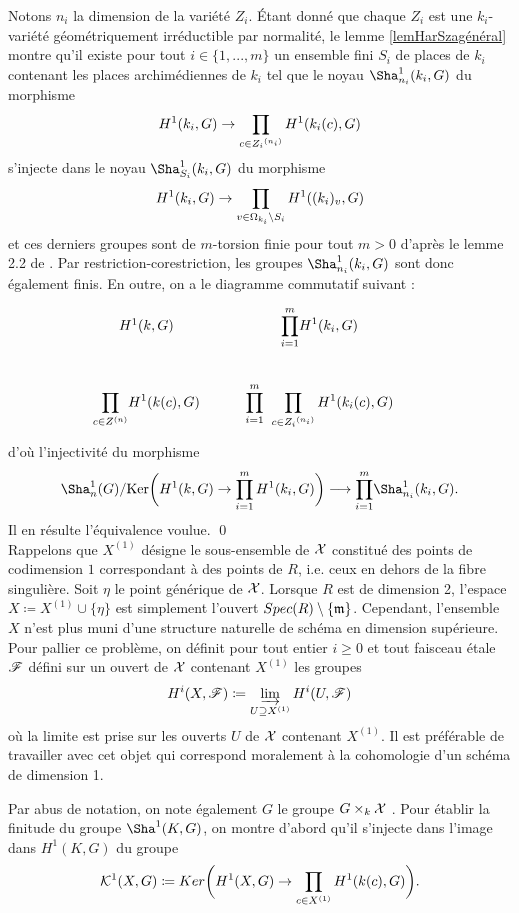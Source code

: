\documentclass[11pt]{article}
\begin{document}
\proof Notons $n_i$ la dimension de la variété $Z_i$. Étant donné que chaque $Z_{i}$ est une $k_i$-variété géométriquement irréductible par normalité, le lemme \ref{lemHarSzagénéral} montre qu'il existe pour tout $i \in \{1,...,m\}$ un ensemble fini $S_i$ de places de $k_i$ contenant les places archimédiennes de $k_i$ tel que le noyau $\Sha^1_{n_i}(k_i,G)$ du morphisme  $$ H^1(k_i,G) \rightarrow \prod_{c \in {Z_{i}}^{(n_i)}} H^1(k_i(c),G)$$ s'injecte dans le noyau $\Sha^1_{S_i}(k_i,G)$ du morphisme
$$
H^1(k_i,G) \rightarrow \prod_{v \in \Omega_{k_i} \setminus S_i} H^1((k_i)_v,G)
$$
et ces derniers groupes sont de $m$-torsion finie pour tout $m>0$ d'après le lemme 2.2 de \cite{HarSza}. Par restriction-corestriction, les groupes $\Sha^1_{n_i}(k_i,G)$ sont donc également finis. En outre, on a le diagramme commutatif suivant :
\[\begin{tikzcd}
 H^1(k,G)  & \displaystyle{\prod_{i=1}^m} H^1(k_i,G)  & \\
 \displaystyle{\prod_{c \in Z^{(n)}}}H^1(k(c),G) & \displaystyle{\prod_{i=1}^m} \hspace{0,2cm}\displaystyle{\prod_{c \in {Z_{i}}^{(n_i)}}H^1(k_i(c),G)}
\end{tikzcd}\]
d'où l'injectivité du morphisme $$
\Sha^1_n(G)/ \text{Ker} \bigg(H^1(k, G) \ra \prod_{i=1}^m H^1(k_i, G)\bigg) \longrightarrow \displaystyle{\prod_{i=1}^m} \Sha^1_{n_i}(k_i,G).
$$
Il en résulte l'équivalence voulue. \qed \\

Rappelons que $X^{(1)}$ désigne le sous-ensemble de $\mathcal{X}$ constitué des points de codimension $1$ correspondant à des points de $R$, i.e. ceux en dehors de la fibre singulière. Soit $\eta$ le point générique de $\mathcal{X}$. Lorsque $R$ est de dimension 2, l'espace $X \coloneqq X^{(1)} \cup \{\eta\}$ est simplement l'ouvert $Spec( R) \setminus \{\mathfrak{m}\} $. Cependant, l'ensemble $X$ n'est plus muni d'une structure naturelle de schéma en dimension supérieure. Pour pallier ce problème, on définit pour tout entier $i \geq 0$ et tout faisceau étale $\mathscr{F}$ défini sur un ouvert de $\mathcal{X}$ contenant $X^{(1)}$ les groupes 
$$ 
H^i(X, \sF) \coloneqq \drl_{U \supseteq X^{(1)}} H^i(U,\sF)
$$
où la limite est prise sur les ouverts $U$ de $\mathcal{X}$ contenant $X^{(1)}$. Il est préférable de travailler avec cet objet qui correspond moralement à la cohomologie d'un schéma de dimension 1.

Par abus de notation, on note également $G$ le groupe $G \times_k \mathcal{X}$ . Pour établir la finitude du groupe $\Sha^1(K,G)$, on montre d'abord qu'il s'injecte dans l'image dans $H^1(K,G)$ du groupe
$$
\CK^1(X,G) \coloneqq Ker\bigg(H^1(X,G) \ra \prod_{c \in X^{(1)}} H^1(k(c), G)\bigg).
$$\\
\end{document}
